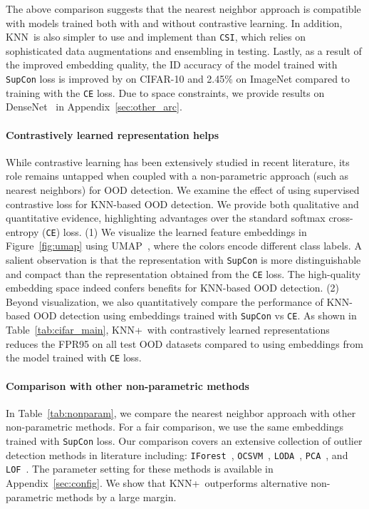 \documentclass[nohyperref]{article}
\newcommand{\method}{{KNN}}
\newcommand{\methodplus}{{KNN+}}
\theoremstyle{plain}
\theoremstyle{definition}
\theoremstyle{remark}
\begin{document}
	\vspace{-0.2cm}
The above comparison suggests that the nearest neighbor approach is compatible with models trained both with and without contrastive learning. In addition, \method~is also simpler to use and implement than \texttt{CSI}, which relies on sophisticated data augmentations and ensembling in testing. Lastly, as a result of the improved embedding quality, the ID accuracy of the model trained with \texttt{SupCon} loss is improved by  on CIFAR-10 and 2.45\% on ImageNet compared to training with the \texttt{CE} loss. 
Due to space constraints, we provide results on  DenseNet~\citep{huang2017densely} in Appendix~\ref{sec:other_arc}. 




\paragraph{Contrastively learned representation helps} While contrastive learning has been extensively studied in recent literature, {its role remains untapped when coupled with a non-parametric approach} (such as nearest neighbors) for OOD detection. We examine the effect of using supervised contrastive loss for KNN-based OOD detection. We provide both qualitative and quantitative evidence, highlighting advantages over the standard softmax cross-entropy (\texttt{CE}) loss. (1) We visualize the learned feature embeddings in Figure~\ref{fig:umap} using UMAP~\citep{mcinnes2018umap-software}, where the colors encode different class labels. A salient observation is that the representation with \texttt{SupCon} is more distinguishable and compact than the representation obtained from the \texttt{CE} loss. The high-quality embedding space indeed confers benefits for KNN-based OOD detection. (2) Beyond visualization, we also quantitatively compare the performance of KNN-based OOD detection using embeddings trained with \texttt{SupCon} vs \texttt{CE}. As shown in 
Table~\ref{tab:cifar_main}, \methodplus~with contrastively learned representations reduces the FPR95 on all test OOD datasets compared to using embeddings from the model trained with \texttt{CE} loss. 



\vspace{-0.2cm}
\paragraph{Comparison with other non-parametric methods } In Table~\ref{tab:nonparam}, we compare the nearest neighbor approach with other non-parametric methods. For a fair comparison, we use the same embeddings trained with \texttt{SupCon} loss. Our comparison  covers  an  extensive  collection of outlier detection methods in literature including: \texttt{IForest}~\citep{liu2008iforest}, \texttt{OCSVM}~\citep{bernhard2001ocsvm}, 
\texttt{LODA}~\citep{2016loda}, 
\texttt{PCA}~\citep{shyu2003pca}, and
\texttt{LOF}~\citep{breunig2000lof}. The parameter setting for these methods is available in Appendix~\ref{sec:config}. We show that \methodplus~outperforms alternative non-parametric methods by a large margin. 
\end{document}
